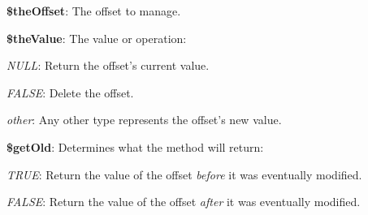\begin{DoxyItemize}
\item {\bfseries \$the\-Offset}\-: The offset to manage. 
\item {\bfseries \$the\-Value}\-: The value or operation\-: 
\begin{DoxyItemize}
\item {\itshape N\-U\-L\-L\/}\-: Return the offset's current value. 
\item {\itshape F\-A\-L\-S\-E\/}\-: Delete the offset. 
\item {\itshape other\/}\-: Any other type represents the offset's new value. 
\end{DoxyItemize}
\item {\bfseries \$get\-Old}\-: Determines what the method will return\-: 
\begin{DoxyItemize}
\item {\itshape T\-R\-U\-E\/}\-: Return the value of the offset {\itshape before\/} it was eventually modified. 
\item {\itshape F\-A\-L\-S\-E\/}\-: Return the value of the offset {\itshape after\/} it was eventually modified. 
\end{DoxyItemize}
\end{DoxyItemize}


